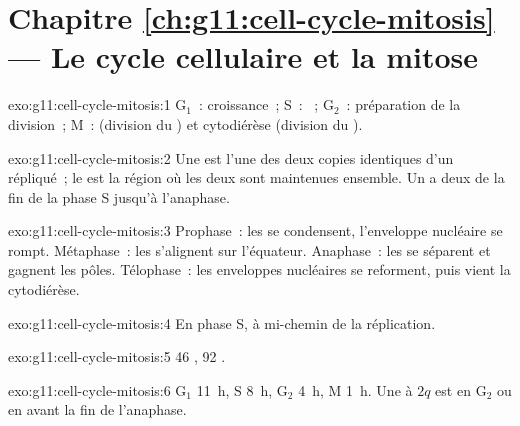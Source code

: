 \section*{Chapitre \ref{ch:g11:cell-cycle-mitosis} --- Le cycle cellulaire et la mitose}

\begin{solution}{exo:g11:cell-cycle-mitosis:1}
$\mathrm{G_1}$~: croissance~; S~: ~;
$\mathrm{G_2}$~: préparation de la division~; M~:  (division du
) et cytodiérèse (division du ).
\end{solution}

\begin{solution}{exo:g11:cell-cycle-mitosis:2}
Une  est l'une des deux copies identiques d'un 
répliqué~; le  est la région où les deux sont maintenues
ensemble. Un  a deux  de la fin de la phase S
jusqu'à l'anaphase.
\end{solution}

\begin{solution}{exo:g11:cell-cycle-mitosis:3}
Prophase~: les  se condensent, l'enveloppe nucléaire se
rompt. Métaphase~: les  s'alignent sur l'équateur.
Anaphase~: les  se séparent et gagnent les pôles.
Télophase~: les enveloppes nucléaires se reforment, puis vient la
cytodiérèse.
\end{solution}

\begin{solution}{exo:g11:cell-cycle-mitosis:4}
En phase S, à mi-chemin de la réplication.
\end{solution}

\begin{solution}{exo:g11:cell-cycle-mitosis:5}
46 , 92 .
\end{solution}

\begin{solution}{exo:g11:cell-cycle-mitosis:6}
$\mathrm{G_1}$ \qty{11}{h}, S \qty{8}{h}, $\mathrm{G_2}$ \qty{4}{h},
M \qty{1}{h}. Une  à $2q$ est en $\mathrm{G_2}$ ou en 
avant la fin de l'anaphase.
\end{solution}

